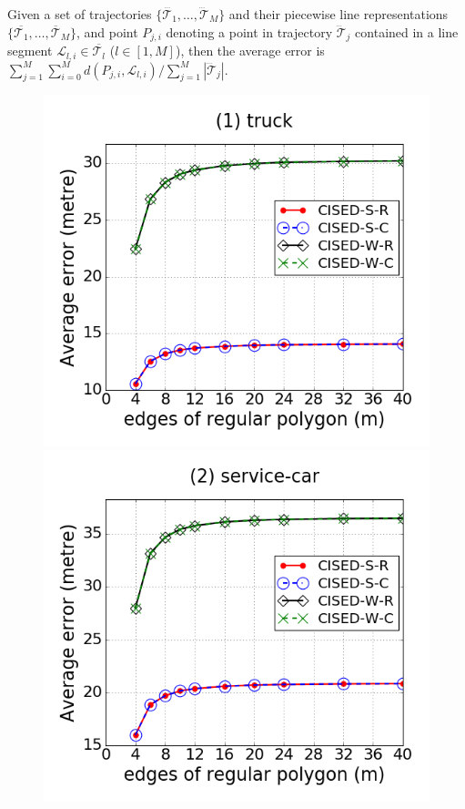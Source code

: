 Given a set of trajectories $\{\dddot{\mathcal{T}_1}, \ldots, \dddot{\mathcal{T}}_M\}$ and their piecewise line representations $\{\overline{\mathcal{T}_1}, \ldots, \overline{\mathcal{T}}_M\}$, and point $P_{j,i}$ denoting
a point in trajectory $\dddot{\mathcal{T}}_j$ contained in a line segment $\mathcal{L}_{l,i}\in\overline{\mathcal{T}_l}$ ($l\in[1,M]$),
then the average error is $\sum_{j=1}^{M}\sum_{i=0}^{M} d(P_{j,i},
\mathcal{L}_{l,i})/\sum_{j=1}^{M}{|\dddot{\mathcal{T}}_j |}$.




\begin{figure}[tb!]
\centering
\includegraphics[scale = 0.240]{figures/Exp-M-e-60-error-truck.png}
\includegraphics[scale = 0.240]{figures/Exp-M-e-60-error-service.png}

\end{figure}
